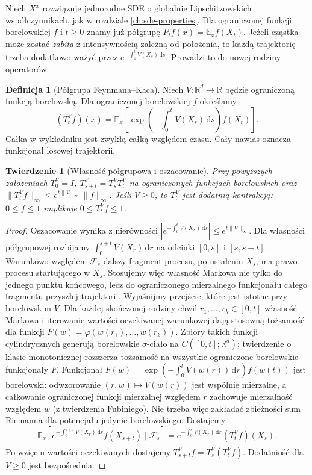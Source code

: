 \documentclass[11pt,a4paper,oneside]{report}
\numberwithin{equation}{chapter}
\theoremstyle{plain}
\newtheorem{twierdzenie}{Twierdzenie}[chapter]
\theoremstyle{definition}
\newtheorem{definicja}{Definicja}[chapter]
\theoremstyle{remark}
\newcommand{\R}{\mathbb{R}}
\newcommand{\E}{\mathbb{E}}
\newcommand{\calF}{\mathcal{F}}
\newcommand{\dd}{\mathrm{d}}
\newcommand{\norm}[1]{\lVert #1\rVert}
\begin{document}
Niech $X^x$ rozwiązuje jednorodne SDE o globalnie
Lipschitzowskich współczynnikach, jak w
rozdziale \ref{ch:sde-properties}. Dla ograniczonej
funkcji borelowskiej $f$ i $t\ge0$ znamy już półgrupę
$P_tf(x)=\E_xf(X_t)$. Jeżeli cząstka może zostać
\emph{zabita} z intensywnością zależną od położenia,
to każdą trajektorię trzeba dodatkowo ważyć przez
$e^{-\int_0^tV(X_s)\,\dd s}$. Prowadzi to do
nowej rodziny operatorów.

\begin{definicja}[Półgrupa Feynmana--Kaca]\label{def:volIII:07:02}
\label{def:fk-semigroup}
Niech $V:\R^d\to\R$ będzie ograniczoną funkcją
borelowską. Dla ograniczonej borelowskiej $f$ określamy
\[
(T_t^Vf)(x)=\E_x\left[
\exp\left(-\int_0^tV(X_s)\,\dd s\right)f(X_t)\right].
\]
Całka w wykładniku jest zwykłą całką względem czasu.
Cały nawias oznacza funkcjonał losowej trajektorii.
\end{definicja}

\begin{twierdzenie}[Własność półgrupowa i oszacowanie]\label{thm:volIII:07:03}
\label{th:fk-semigroup}
Przy powyższych założeniach $T_0^V=I$,
$T_{s+t}^V=T_s^VT_t^V$ na ograniczonych
funkcjach borelowskich oraz
$\norm{T_t^Vf}_\infty\le e^{t\norm V_\infty}\norm f_\infty$.
Jeśli $V\ge0$, to $T_t^V$ jest dodatnią kontrakcją:
$0\le f\le1$ implikuje $0\le T_t^Vf\le1$.
\end{twierdzenie}
\begin{proof}
Oszacowanie wynika z nierówności
$|e^{-\int_0^t V(X_s)\,\dd s}|\le e^{t\norm V_\infty}$.
Dla własności półgrupowej rozbijamy
$\int_0^{s+t}V(X_r)\,\dd r$ na odcinki
$[0,s]$ i $[s,s+t]$. Warunkowo względem $\calF_s$
dalszy fragment procesu, po ustaleniu $X_s$, ma
prawo procesu startującego w $X_s$.
Stosujemy więc własność Markowa nie tylko do
jednego punktu końcowego, lecz do ograniczonego
mierzalnego funkcjonału całego fragmentu przyszłej trajektorii.
Wyjaśnijmy przejście, które jest istotne przy borelowskim $V$.
Dla każdej skończonej rodziny chwil $r_1,\ldots,r_k\in[0,t]$
własność Markowa i iterowanie wartości oczekiwanej warunkowej
dają stosowną tożsamość dla funkcji
$F(w)=\varphi(w(r_1),\ldots,w(r_k))$.
Zbiory takich funkcji cylindrycznych generują borelowskie
$\sigma$-ciało na $C([0,t];\R^d)$; twierdzenie o klasie
monotonicznej rozszerza tożsamość na wszystkie ograniczone
borelowskie funkcjonały $F$. Funkcjonał
$F(w)=\exp(-\int_0^tV(w(r))\,\dd r)f(w(t))$
jest borelowski: odwzorowanie $(r,w)\mapsto V(w(r))$
jest wspólnie mierzalne, a całkowanie ograniczonej funkcji
mierzalnej względem $r$ zachowuje mierzalność względem $w$
(z twierdzenia Fubiniego). Nie trzeba więc zakładać
zbieżności sum Riemanna dla potencjału jedynie borelowskiego.
Dostajemy
\[
\E_x\left[e^{-\int_0^{s+t}V(X_r)\,\dd r}f(X_{s+t})
\mid\calF_s\right]
=e^{-\int_0^sV(X_r)\,\dd r}(T_t^Vf)(X_s).
\]
Po wzięciu wartości oczekiwanych dostajemy
$T_{s+t}^Vf=T_s^V(T_t^Vf)$. Dodatniość dla $V\ge0$
jest bezpośrednia.
\end{proof}
\end{document}
